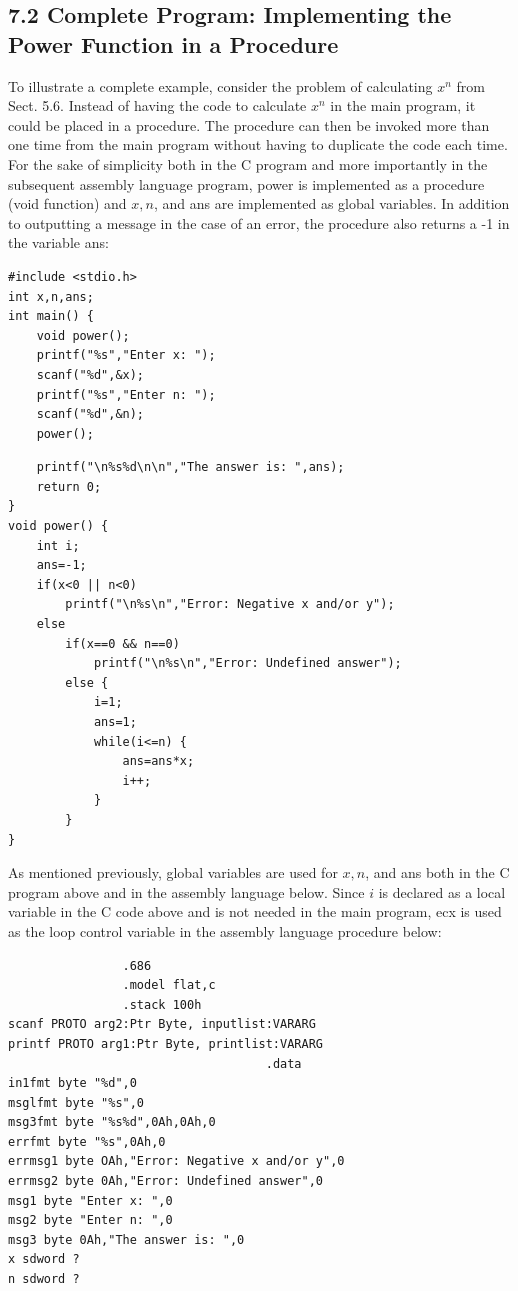 \documentclass[10pt]{article}
\begin{document}
\subsection*{7.2 Complete Program: Implementing the Power Function in a Procedure}
To illustrate a complete example, consider the problem of calculating $x^{n}$ from Sect. 5.6. Instead of having the code to calculate $x^{n}$ in the main program, it could be placed in a procedure. The procedure can then be invoked more than one time from the main program without having to duplicate the code each time. For the sake of simplicity both in the C program and more importantly in the subsequent assembly language program, power is implemented as a procedure (void function) and $x, n$, and ans are implemented as global variables. In addition to outputting a message in the case of an error, the procedure also returns a -1 in the variable ans:

\begin{verbatim}
#include <stdio.h>
int x,n,ans;
int main() {
    void power();
    printf("%s","Enter x: ");
    scanf("%d",&x);
    printf("%s","Enter n: ");
    scanf("%d",&n);
    power();
\end{verbatim}

\begin{verbatim}
    printf("\n%s%d\n\n","The answer is: ",ans);
    return 0;
}
void power() {
    int i;
    ans=-1;
    if(x<0 || n<0)
        printf("\n%s\n","Error: Negative x and/or y");
    else
        if(x==0 && n==0)
            printf("\n%s\n","Error: Undefined answer");
        else {
            i=1;
            ans=1;
            while(i<=n) {
                ans=ans*x;
                i++;
            }
        }
}
\end{verbatim}

As mentioned previously, global variables are used for $x, n$, and ans both in the C program above and in the assembly language below. Since $i$ is declared as a local variable in the C code above and is not needed in the main program, ecx is used as the loop control variable in the assembly language procedure below:

\begin{verbatim}
                .686
                .model flat,c
                .stack 100h
scanf PROTO arg2:Ptr Byte, inputlist:VARARG
printf PROTO arg1:Ptr Byte, printlist:VARARG
                                    .data
in1fmt byte "%d",0
msglfmt byte "%s",0
msg3fmt byte "%s%d",0Ah,0Ah,0
errfmt byte "%s",0Ah,0
errmsg1 byte OAh,"Error: Negative x and/or y",0
errmsg2 byte 0Ah,"Error: Undefined answer",0
msg1 byte "Enter x: ",0
msg2 byte "Enter n: ",0
msg3 byte 0Ah,"The answer is: ",0
x sdword ?
n sdword ?
\end{verbatim}
\end{document}
